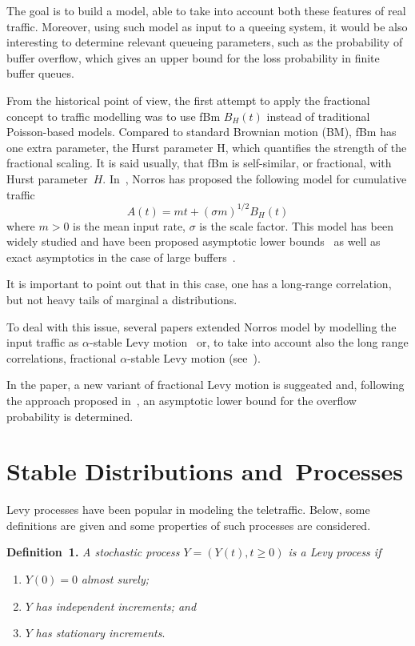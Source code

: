 \begin{multicols}{2}
The goal is to build a model, able to take into account both these features of real traffic. 
Moreover, using such model as input to a queeing system, it would 
be also interesting to determine relevant 
queueing parameters, such as the probability of buffer overflow, which gives an upper bound for 
the loss probability in finite buffer queues. 

From the historical point of view, 
the first attempt to apply the fractional concept to traffic modelling was to use 
fBm $B_H (t)$ instead of traditional Poisson-based models. 
Compared to standard Brownian motion (BM), fBm has one extra parameter, the Hurst parameter 
H, which quantifies the strength of the fractional scaling. It is said usually, that 
fBm is self-similar, or fractional, with Hurst parameter~$H$. In~\cite{10-nik},
Norros has proposed the following model for cumulative traffic 
$$
A(t) = m t + (\sigma m)^{1/2} B_H (t) 
$$
where $m>0$ is the mean input rate, $\sigma$ is the scale factor. This model has been widely studied 
and have been proposed asymptotic lower bounds~\cite{10-nik} as well as exact asymptotics 
in the case of large buffers~\cite{11-nik, 12-nik}.

It is important to point out that in this case, one has a
long-range correlation, but not heavy tails of marginal 
a distributions.

To deal with this issue, several papers extended Norros model by modelling the input traffic as 
$\alpha$-stable Levy motion~\cite{13-nik, 14-nik} or, to take into account also the long range 
correlations, fractional $\alpha$-stable Levy motion (see~\cite{16-nik, 15-nik}).

In the paper, a new variant of  fractional Levy motion is suggeated and, following the 
approach proposed in~\cite{10-nik},
an asymptotic lower bound for the overflow probability is determined. 


\section{Stable Distributions and~Processes}

\noindent
Levy processes have been popular in modeling the teletraffic. Below, some 
definitions are given and some properties of such processes are considered. 

\smallskip

\noindent
\textbf{Definition~1.} \textit{A stochastic process $Y = (Y(t), t\geq 0)$ is a Levy process if}
\begin{enumerate}[(1)]
\item $Y(0) = 0$ \textit{almost surely;} 
\item
 $Y$ \textit{has independent increments; and}  
\item
$Y$ \textit{has stationary increments}. 
\end{enumerate}


\end{multicols}
